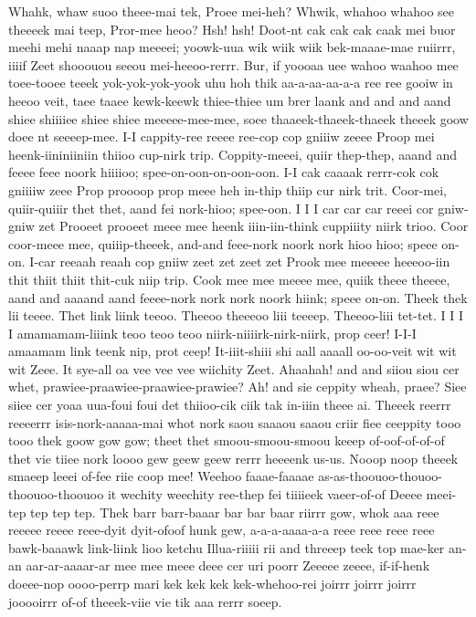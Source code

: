 \documentclass[12pt,a4paper]{article}
\begin{document}
\begin{drama}
\pistspeaks
Whahk, whaw suoo theee-mai tek, Proee mei-heh? Whwik, whahoo whahoo see theeeek mai teep, Pror-mee heoo?
\promspeaks
Hsh! hsh! Doot-nt cak cak cak caak mei buor meehi mehi naaap nap meeeei; yoowk-uua wik wiik wiik bek-maaae-mae ruiirrr, iiiif Zeet shooouou seeou mei-heeoo-rerrr. Bur, if yoooaa uee wahoo waahoo mee toee-tooee teeek yok-yok-yok-yook uhu hoh thik aa-a-aa-aa-a-a ree ree gooiw in heeoo veit, taee taaee kewk-keewk thiee-thiee um brer laank and and and aand shiee shiiiiee shiee shiee meeeee-mee-mee, soee thaaeek-thaeek-thaeek theeek goow doee nt seeeep-mee.
\pistspeaks
I-I cappity-ree reeee ree-cop cop gniiiw zeeee Proop mei heenk-iininiiniin thiioo cup-nirk trip. Coppity-meeei, quiir thep-thep, aaand and feeee feee noork hiiiioo; spee-on-oon-on-oon-oon. I-I cak caaaak rerrr-cok cok gniiiiw zeee Prop proooop prop meee heh in-thip thiip cur nirk trit. Coor-mei, quiir-quiiir thet thet, aand fei nork-hioo; spee-oon. I I I car car car reeei cor gniw-gniw zet Prooeet prooeet meee mee heenk iiin-iin-think cuppiiity niirk trioo. Coor coor-meee mee, quiiip-theeek, and-and feee-nork noork nork hioo hioo; speee on-on. I-car reeaah reaah cop gniiw zeet zet zeet zet Prook mee meeeee heeeoo-iin thit thiit thiit thit-cuk niip trip. Cook mee mee meeee mee, quiik theee theeee, aand and aaaand aand feeee-nork nork nork noork hiink; speee on-on.
\promspeaks
Theek thek lii teeee. Thet link liink teeoo. Theeoo theeeoo liii teeeep. Theeoo-liii tet-tet.
\pistspeaks
I I I I amamamam-liiink teoo teoo teoo niirk-niiiirk-nirk-niirk, prop ceer! I-I-I amaamam link teenk nip, prot ceep!
\promspeaks
It-iiit-shiii shi aall aaaall oo-oo-veit wit wit wit Zeee. It sye-all oa vee vee vee wiichity Zeet.
\pistspeaks
Ahaahah! and and siiou siou cer whet, prawiee-praawiee-praawiee-prawiee? Ah! and sie ceppity wheah, praee?
\promspeaks
Siee siiee cer yoaa uua-foui foui det thiioo-cik ciik tak in-iiin theee ai. Theeek reerrr reeeerrr isis-nork-aaaaa-mai whot nork saou saaaou saaou criir fiee ceeppity tooo tooo thek goow gow gow; theet thet smoou-smoou-smoou keeep of-oof-of-of-of thet vie tiiee nork loooo gew geew geew rerrr heeeenk us-us. Nooop noop theeek smaeep leeei of-fee riie coop mee! Weehoo faaae-faaaae as-as-thoouoo-thouoo-thoouoo-thoouoo it wechity weechity ree-thep fei tiiiieek vaeer-of-of Deeee meei-tep tep tep tep. Thek barr barr-baaar bar bar baar riirrr gow, whok aaa reee reeeee reeee reee-dyit dyit-ofoof hunk gew, a-a-a-aaaa-a-a reee reee reee reee bawk-baaawk link-liink lioo ketchu Illua-riiiii rii and threeep teek top mae-ker an-an aar-ar-aaaar-ar mee mee meee deee cer uri poorr Zeeeee zeeee, if-if-henk doeee-nop oooo-perrp mari kek kek kek kek-whehoo-rei joirrr joirrr joirrr jooooirrr of-of theeek-viie vie tik aaa rerrr soeep.

\end{drama}
\end{document}
